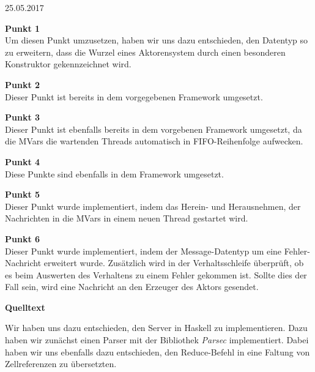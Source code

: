 \documentclass{rp}
\begin{document}


{25.05.2017} %

%
\textbf{Punkt 1}\\
Um diesen Punkt umzusetzen, haben wir uns dazu entschieden, den Datentyp so zu erweitern, dass die Wurzel eines Aktorensystem durch einen besonderen Konstruktor gekennzeichnet wird. 

\textbf{Punkt 2}\\
Dieser Punkt ist bereits in dem vorgegebenen Framework umgesetzt. 

\textbf{Punkt 3}\\
Dieser Punkt ist ebenfalls bereits in dem vorgebenen Framework umgesetzt, da die MVars die wartenden Threads automatisch in FIFO-Reihenfolge aufwecken.

\textbf{Punkt 4}\\
Diese Punkte sind ebenfalls in dem Framework umgesetzt. 

\textbf{Punkt 5}\\
Dieser Punkt wurde implementiert, indem das Herein- und Herausnehmen, der Nachrichten in die MVars in einem neuen Thread gestartet wird. 

\textbf{Punkt 6}\\
Dieser Punkt wurde implementiert, indem der Message-Datentyp um eine Fehler-Nachricht erweitert wurde. Zusätzlich wird in der Verhaltsschleife überprüft, ob es beim Auswerten des Verhaltens zu einem Fehler gekommen ist. Sollte dies der Fall sein, wird eine Nachricht an den Erzeuger des Aktors gesendet.

\textbf{Quelltext}\\

Wir haben uns dazu entschieden, den Server in Haskell zu implementieren. Dazu haben wir zunächst einen Parser mit der Bibliothek \textit{Parsec} implementiert. Dabei haben wir uns ebenfalls dazu entschieden, den Reduce-Befehl in eine Faltung von Zellreferenzen zu übersetzten. 
\end{document}
